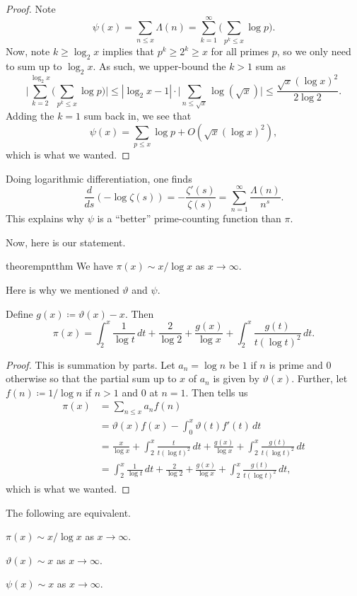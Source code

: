 \documentclass[../notes.tex]{subfiles}
\begin{document}
\begin{proof}
	Note
	\[\psi(x)=\sum_{n\le x}\Lambda(n)=\sum_{k=1}^\infty\Bigg(\sum_{p^k\le x}\log p\Bigg).\]
	Now, note $k\ge\log_2x$ implies that $p^k\ge2^k\ge x$ for all primes $p$, so we only need to sum up to $\log_2x$. As such, we upper-bound the $k>1$ sum as
	\[\Bigg|\sum_{k=2}^{\log_2x}\Bigg(\sum_{p^k\le x}\log p\Bigg)\Bigg|\le|\log_2x-1|\cdot\Bigg|\sum_{n\le\sqrt x}\log(\sqrt x)\Bigg|\le\frac{\sqrt x(\log x)^2}{2\log2}.\]
	Adding the $k=1$ sum back in, we see that
	\[\psi(x)=\sum_{p\le x}\log p+O\left(\sqrt x(\log x)^2\right),\]
	which is what we wanted.
\end{proof}
\begin{remark}
	Doing logarithmic differentiation, one finds
	\[\frac d{ds}(-\log\zeta(s))=-\frac{\zeta'(s)}{\zeta(s)}=\sum_{n=1}^\infty\frac{\Lambda(n)}{n^s}.\]
	This explains why $\psi$ is a ``better'' prime-counting function than $\pi$.
\end{remark}
Now, here is our statement.
\begin{restatable}{theorem}{pntthm} \label{thm:pnt}
	We have $\pi(x)\sim x/\log x$ as $x\to\infty$.
\end{restatable}
\noindent Here is why we mentioned $\vartheta$ and $\psi$.
\begin{lemma} \label{lem:get-pi-error}
	Define $g(x)\coloneqq\vartheta(x)-x$. Then
	\[\pi(x)=\int_2^x\frac1{\log t}\,dt+\frac2{\log2}+\frac{g(x)}{\log x}+\int_2^x\frac{g(t)}{t(\log t)^2}\,dt.\]
\end{lemma}
\begin{proof}
	This is summation by parts. Let $a_n=\log n$ be $1$ if $n$ is prime and $0$ otherwise so that the partial sum up to $x$ of $a_n$ is given by $\vartheta(x)$. Further, let $f(n)\coloneqq1/\log n$ if $n>1$ and $0$ at $n=1$. Then  tells us
	\begin{align*}
		\pi(x) &= \sum_{n\le x}a_nf(n) \\
		&= \vartheta(x)f(x)-\int_0^x\vartheta(t)f'(t)\,dt \\
		&= \frac{x}{\log x}+\int_2^x\frac{t}{t(\log t)^2}\,dt+\frac{g(x)}{\log x}+\int_2^x\frac{g(t)}{t(\log t)^2}\,dt \\
		&= \int_2^x\frac1{\log t}\,dt+\frac2{\log2}+\frac{g(x)}{\log x}+\int_2^x\frac{g(t)}{t(\log t)^2}\,dt,
	\end{align*}
	which is what we wanted.
\end{proof}
\begin{proposition}
	The following are equivalent.
	\begin{listalph}
		\item $\pi(x)\sim x/\log x$ as $x\to\infty$.
		\item $\vartheta(x)\sim x$ as $x\to\infty$.
		\item $\psi(x)\sim x$ as $x\to\infty$.
	\end{listalph}
\end{proposition}
\end{document}
